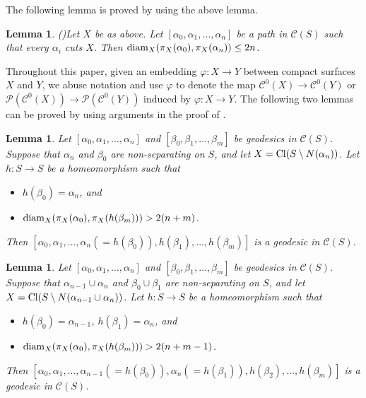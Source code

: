 \documentclass[]{aspm}
\newtheorem{lemma}[definition]{Lemma}
\begin{document}
The following lemma is proved by using the above lemma.

\begin{lemma}(\cite[Lemma 2.1]{IJK})\label{subsurface distance}
Let $X$ be as above. 
Let $[\alpha_{0}, \alpha_{1}, \dots, \alpha_{n}]$ be a path in $\mathcal{C}(S)$
such that every $\alpha_{i}$ cuts $X$. 
Then ${\rm diam}_{X}(\pi_{X}(\alpha_{0}), \pi_{X}(\alpha_{n}))\leq 2n$.
\end{lemma}


Throughout this paper, given an embedding $\varphi:X\rightarrow Y$ between compact surfaces $X$ and $Y$, we abuse notation and use $\varphi$ to denote the map $\mathcal{C}^0(X)\rightarrow \mathcal{C}^0(Y)$ or $ \mathcal{P}(\mathcal{C}^0(X))\rightarrow  \mathcal{P}(\mathcal{C}^0(Y))$ induced by $\varphi:X\rightarrow Y$.
The following two lemmas can be proved by using arguments in the proof of \cite[Propositions 4.1, 4.4]{IJK}.

\begin{lemma}\label{extending geodesic}
Let $[\alpha_{0}, \alpha_{1}, \dots, \alpha_{n}]$ and $[\beta_{0}, \beta_{1}, \dots, \beta_{m}]$ be geodesics in $\mathcal{C}(S)$.
Suppose that $\alpha_{n}$ and $\beta_{0}$ are non-separating on $S$, and let $X={\rm Cl}(S\setminus N(\alpha_{n}))$.
Let $h:S\rightarrow S$ be a homeomorphism such that
\begin{itemize}
\item $h(\beta_0)=\alpha_n$, and
\item ${\rm diam}_X(\pi_X(\alpha_0), \pi_X(h(\beta_m)))>2(n+m)$.
\end{itemize}
Then $[\alpha_{0}, \alpha_{1}, \dots, \alpha_{n}(=h(\beta_{0})), h(\beta_{1}), \dots, h(\beta_{m})]$ is a geodesic in $\mathcal{C}(S)$.
\end{lemma}


\begin{lemma}\label{extending geodesic2}
Let $[\alpha_{0}, \alpha_{1}, \dots, \alpha_{n}]$ and $[\beta_{0}, \beta_{1}, \dots, \beta_{m}]$ be geodesics in $\mathcal{C}(S)$.
Suppose that $\alpha_{n-1}\cup \alpha_n$ and $\beta_0\cup \beta_1$ are non-separating on $S$, and let $X={\rm Cl}(S\setminus N(\alpha_{n-1}\cup\alpha_n))$.
Let $h:S\rightarrow S$ be a homeomorphism such that
\begin{itemize}
\item $h(\beta_0)=\alpha_{n-1}$, $h(\beta_1)=\alpha_n$, and
\item ${\rm diam}_X(\pi_X(\alpha_0), \pi_X(h(\beta_m)))>2(n+m-1)$.
\end{itemize}
Then $[\alpha_{0}, \alpha_{1}, \dots, \alpha_{n-1}(=h(\beta_{0})), \alpha_{n}(=h(\beta_{1})), h(\beta_{2}), \dots, h(\beta_{m})]$ is a geodesic in $\mathcal{C}(S)$.
\end{lemma}
\end{document}
